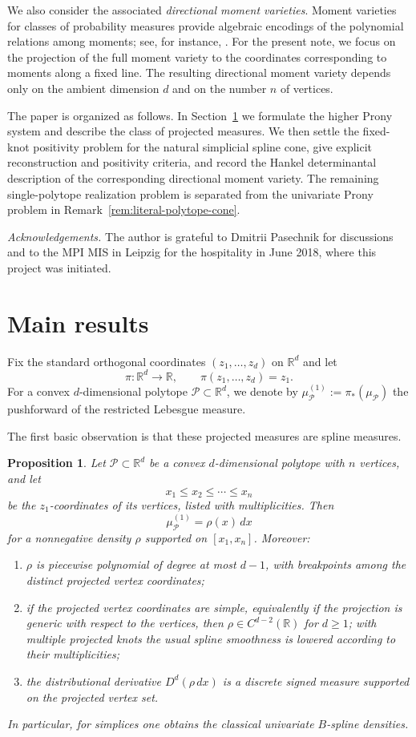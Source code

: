 \documentclass[reqno]{amsart}
\numberwithin{theorem}{section}
\newtheorem{proposition}[theorem]{Proposition}
\newcommand{\RR}{\mathbb{R}}
\newcommand{\cP}{\mathcal{P}}
\begin{document}
We also consider the associated \emph{directional moment varieties}. Moment varieties for classes of probability measures provide algebraic encodings of the polynomial relations among moments; see, for instance, \cite{ARS}. For the present note, we focus on the projection of the full moment variety to the coordinates corresponding to moments along a fixed line. The resulting directional moment variety depends only on the ambient dimension $d$ and on the number $n$ of vertices.

The paper is organized as follows. In Section~\ref{sec:main} we formulate the higher Prony system and describe the class of projected measures. We then settle the fixed-knot positivity problem for the natural simplicial spline cone, give explicit reconstruction and positivity criteria, and record the Hankel determinantal description of the corresponding directional moment variety. The remaining single-polytope realization problem is separated from the univariate Prony problem in Remark~\ref{rem:literal-polytope-cone}.

\medskip
\noindent
\emph{Acknowledgements.}
The author is grateful to Dmitrii Pasechnik for discussions and to the MPI MIS in Leipzig for the hospitality in June 2018, where this project was initiated.

\section{Main results}\label{sec:main}

Fix the standard orthogonal coordinates $(z_1,\dots,z_d)$ on $\RR^d$ and let
\[
\pi:\RR^d\to\RR, \qquad \pi(z_1,\dots,z_d)=z_1.
\]
For a convex $d$-dimensional polytope $\cP\subset\RR^d$, we denote by $\mu_{\cP}^{(1)}:=\pi_*(\mu_{\cP})$ the pushforward of the restricted Lebesgue measure.

The first basic observation is that these projected measures are spline measures.

\begin{proposition}\label{prop:proj}
Let $\cP\subset\RR^d$ be a convex $d$-dimensional polytope with $n$ vertices, and let
\[
x_1\leq x_2\leq \cdots \leq x_n
\]
be the $z_1$-coordinates of its vertices, listed with multiplicities. Then
\[
\mu_{\cP}^{(1)}=\rho(x)\,dx
\]
for a nonnegative density $\rho$ supported on $[x_1,x_n]$. Moreover:
\begin{enumerate}
    \item $\rho$ is piecewise polynomial of degree at most $d-1$, with breakpoints among the distinct projected vertex coordinates;
    \item if the projected vertex coordinates are simple, equivalently if the projection is generic with respect to the vertices, then $\rho\in C^{d-2}(\RR)$ for $d\ge 1$; with multiple projected knots the usual spline smoothness is lowered according to their multiplicities;
    \item the distributional derivative $D^d(\rho\,dx)$ is a discrete signed measure supported on the projected vertex set.
\end{enumerate}
In particular, for simplices one obtains the classical univariate $B$-spline densities.
\end{proposition}
\end{document}
